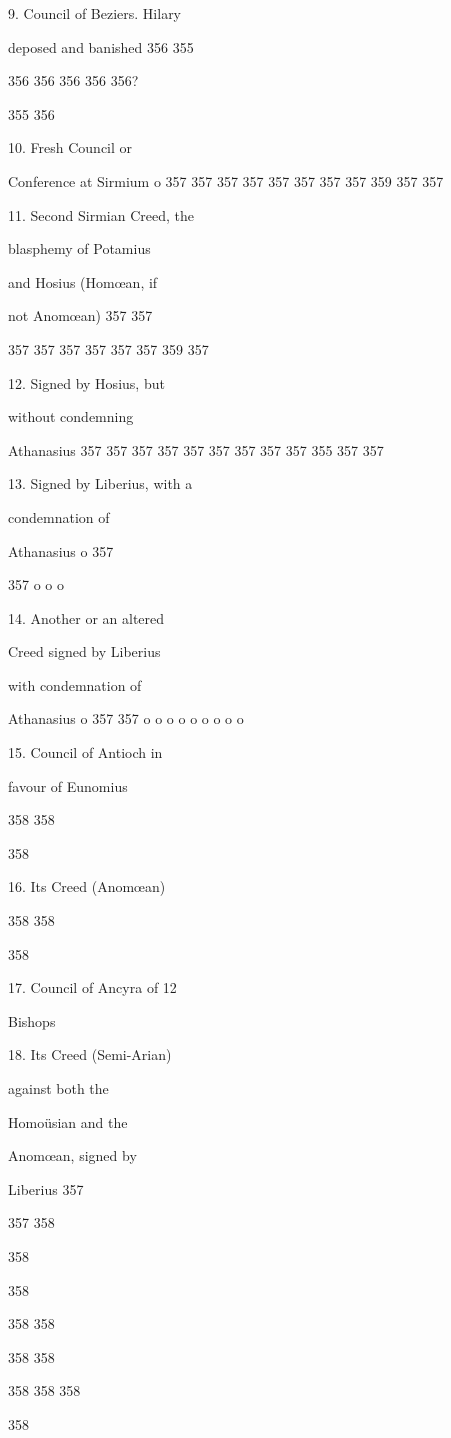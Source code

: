 9. Council of Beziers.
Hilary

deposed and banished
356
355

356
356
356
356
356?

355
356

10. Fresh Council or 

Conference at Sirmium
o
357
357
357
357
357
357
357
357
359
357
357

11. Second Sirmian Creed, the

blasphemy of Potamius

and Hosius (Homœan, if

not Anomœan)
357
357

357
357
357
357
357
357
359
357

12. Signed by Hosius, but

without condemning

Athanasius
357
357
357
357
357
357
357
357
357
355
357
357

13. Signed by Liberius, with a

condemnation of

Athanasius
o
357

357
o
o
o

14. Another or an altered

Creed signed by Liberius

with condemnation of

Athanasius
o
357
357
o
o
o
o
o
o
o
o
o

15. Council of Antioch in

favour of Eunomius

358
358

358

16. Its Creed (Anomœan)

358
358

358

17. Council of Ancyra of 12

Bishops

18. Its Creed (Semi-Arian)

against both the

Homoüsian and the

Anomœan, signed by

Liberius
357

357
358

358

358

358
358

358
358

358
358
358

358

